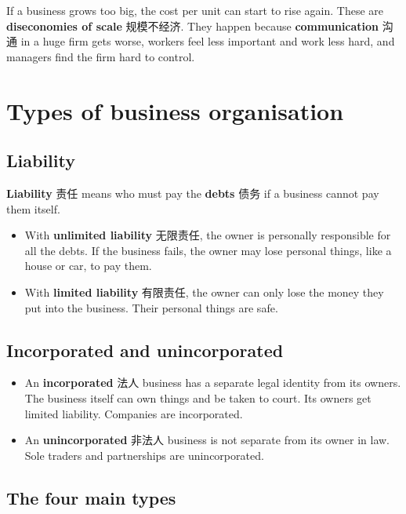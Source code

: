 \documentclass[11pt]{article}
\begin{document}
If a business grows too big, the cost per unit can start to rise again. These are \textbf{diseconomies of scale} 规模不经济. They happen because \textbf{communication} 沟通 in a huge firm gets worse, workers feel less important and work less hard, and managers find the firm hard to control.

\section*{Types of business organisation}

\subsection*{Liability}

\textbf{Liability} 责任 means who must pay the \textbf{debts} 债务 if a business cannot pay them itself.

\begin{itemize}
\item With \textbf{unlimited liability} 无限责任, the owner is personally responsible for all the debts. If the business fails, the owner may lose personal things, like a house or car, to pay them.

\item With \textbf{limited liability} 有限责任, the owner can only lose the money they put into the business. Their personal things are safe.

\end{itemize}

\subsection*{Incorporated and unincorporated}

\begin{itemize}
\item An \textbf{incorporated} 法人 business has a separate legal identity from its owners. The business itself can own things and be taken to court. Its owners get limited liability. Companies are incorporated.

\item An \textbf{unincorporated} 非法人 business is not separate from its owner in law. Sole traders and partnerships are unincorporated.

\end{itemize}

\subsection*{The four main types}
\end{document}
